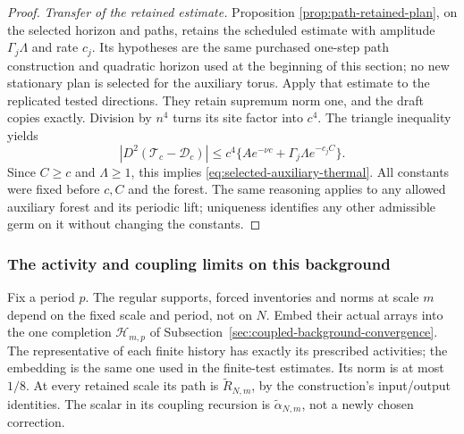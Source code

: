 \begin{proof}
\emph{Transfer of the retained estimate.} Proposition
\ref{prop:path-retained-plan}, on the selected horizon and paths,
retains the scheduled estimate with amplitude $\Gamma_j\Lambda$ and
rate $c_j$. Its hypotheses are the same purchased one-step path
construction and quadratic horizon used at the beginning of this
section; no new stationary plan is selected for the auxiliary torus.
Apply that estimate to the replicated tested directions. They retain
supremum norm one, and the draft copies exactly. Division by $n^4$
turns its site factor into $c^4$. The triangle inequality yields
\[
 |D^2(\mathcal T_c-\mathcal D_c)|
 \le c^4\{A e^{-\nu c}+\Gamma_j\Lambda e^{-c_j C}\}.
\]
Since $C\ge c$ and $\Lambda\ge1$, this implies
\eqref{eq:selected-auxiliary-thermal}. All constants were fixed before
$c,C$ and the forest. The same reasoning applies to any allowed
auxiliary forest and its periodic lift; uniqueness identifies any
other admissible germ on it without changing the constants.
\end{proof}

\subsubsection{The activity and coupling limits on this background}
Fix a period $p$. The regular supports, forced inventories and norms
at scale $m$ depend on the fixed scale and period, not on $N$.
Embed their actual arrays into the one completion $\mathcal H_{m,p}$
of Subsection~\ref{sec:coupled-background-convergence}. The representative
of each finite history has exactly its prescribed activities; the
embedding is the same one used in the finite-test estimates. Its
norm is at most $1/8$. At every retained scale its path is
$\widetilde R_{N,m}$, by the construction's input/output identities.
The scalar in its coupling recursion is
$\widetilde\alpha_{N,m}$, not a newly chosen correction.

